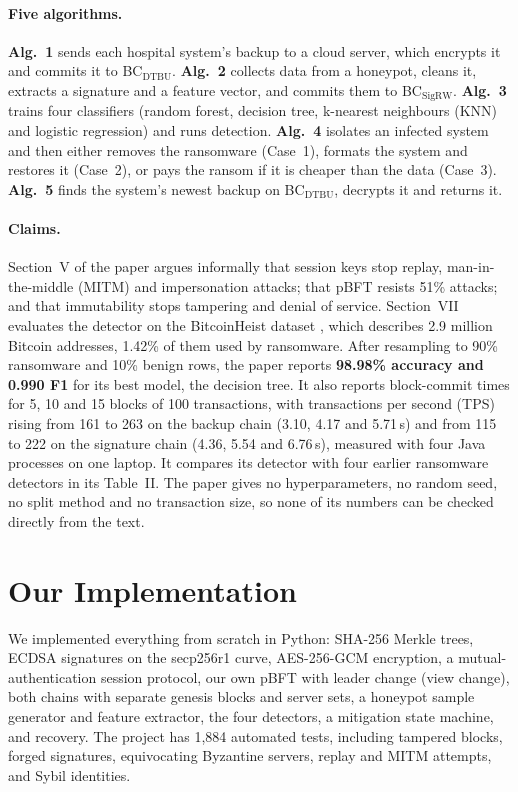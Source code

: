 \documentclass[11pt]{article}
\newcommand{\dtbu}{BC$_{\mathrm{DTBU}}$}
\newcommand{\sigrw}{BC$_{\mathrm{SigRW}}$}
\begin{document}
\paragraph{Five algorithms.}
\textbf{Alg.~1} sends each hospital system's backup to a cloud server, which encrypts it and
commits it to \dtbu{}.
\textbf{Alg.~2} collects data from a honeypot, cleans it, extracts a signature and a feature
vector, and commits them to \sigrw{}.
\textbf{Alg.~3} trains four classifiers (random forest, decision tree, k-nearest neighbours (KNN)
and logistic regression) and runs detection.
\textbf{Alg.~4} isolates an infected system and then either removes the ransomware (Case~1),
formats the system and restores it (Case~2), or pays the ransom if it is cheaper than the data
(Case~3).
\textbf{Alg.~5} finds the system's newest backup on \dtbu{}, decrypts it and returns it.

\paragraph{Claims.}
Section~V of the paper argues informally that session keys stop replay, man-in-the-middle (MITM)
and impersonation attacks; that pBFT resists 51\% attacks; and that immutability stops tampering
and denial of service. Section~VII evaluates the detector on the BitcoinHeist dataset
\citep{akcora2020bitcoinheist}, which describes 2.9 million Bitcoin addresses, 1.42\% of them
used by ransomware. After resampling to 90\% ransomware and 10\% benign rows, the paper reports
\textbf{98.98\% accuracy and 0.990 F1} for its best model, the decision tree. It also reports
block-commit times for 5, 10 and 15 blocks of 100 transactions, with transactions per second
(TPS) rising from 161 to 263 on the backup chain (3.10, 4.17 and 5.71\,s) and from 115 to 222 on
the signature chain (4.36, 5.54 and 6.76\,s), measured with four Java processes on one laptop. It
compares its detector with four earlier ransomware detectors in its Table~II. The paper gives no
hyperparameters, no random seed, no split method and no transaction size, so none of its numbers
can be checked directly from the text.

\section{Our Implementation}
\label{sec:impl}

We implemented everything from scratch in Python: SHA-256 Merkle trees, ECDSA signatures on the
secp256r1 curve, AES-256-GCM encryption, a mutual-authentication session protocol, our own pBFT
with leader change (view change), both chains with separate genesis blocks and server sets,
a honeypot sample generator and feature extractor, the four detectors, a mitigation state
machine, and recovery. The project has 1,884 automated tests, including tampered blocks, forged
signatures, equivocating Byzantine servers, replay and MITM attempts, and Sybil identities.
\end{document}
